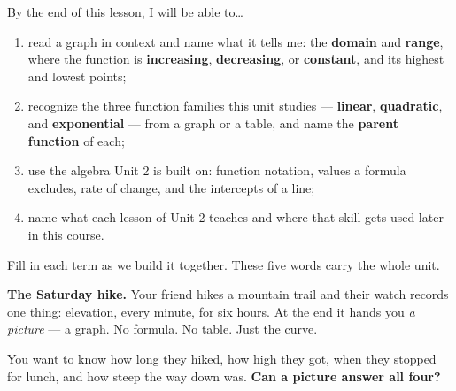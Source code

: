 \documentclass[10pt]{article}
\begin{document}

\vspace{0.15in}

\begin{objectivebox}
\small
By the end of this lesson, I will be able to\dots
\begin{enumerate}[leftmargin=1.5em, itemsep=2pt, topsep=3pt]
  \item read a graph in context and name what it tells me: the \textbf{domain} and \textbf{range},
        where the function is \textbf{increasing}, \textbf{decreasing}, or \textbf{constant}, and
        its highest and lowest points;
  \item recognize the three function families this unit studies --- \textbf{linear},
        \textbf{quadratic}, and \textbf{exponential} --- from a graph or a table, and name the
        \textbf{parent function} of each;
  \item use the algebra Unit 2 is built on: function notation, values a formula excludes, rate of
        change, and the intercepts of a line;
  \item name what each lesson of Unit 2 teaches and where that skill gets used later in this
        course.
\end{enumerate}
\end{objectivebox}

\vspace{0.10in}

\boxguard
\begin{vocabbox}
\small
Fill in each term as we build it together. These five words carry the whole unit.
\end{vocabbox}

\vspace{0.10in}

\boxguard[12]
\begin{hookbox}
\small
\textbf{The Saturday hike.} Your friend hikes a mountain trail and their watch records one thing:
elevation, every minute, for six hours. At the end it hands you \emph{a picture} --- a graph. No
formula. No table. Just the curve.

You want to know how long they hiked, how high they got, when they stopped for lunch, and how
steep the way down was. \textbf{Can a picture answer all four?}

\end{hookbox}
\end{document}
